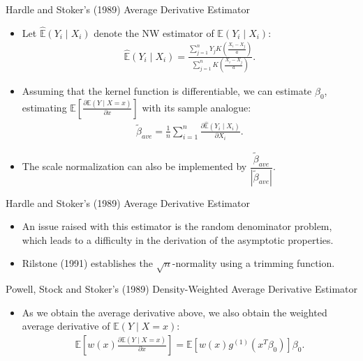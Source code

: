 \documentclass[xcolor=svgnames,dvipdfmx,cjk]{beamer}
\theoremstyle{example}
\def\E{\mathbb{E}}
\begin{document}
\begin{frame}{Hardle and Stoker's (1989) Average Derivative Estimator}
\begin{itemize}
  \item Let $\hat{\E}(Y_i \mid X_i)$ denote the NW estimator of $\E(Y_i \mid X_i)$:
        \begin{align*}
          \hat{\E}(Y_i \mid X_i) 
          = \frac
            {\sum_{j=1}^{n} Y_j K\left( \frac{X_i - X_j}{a} \right)}
            {\sum_{j=1}^{n} K\left( \frac{X_i - X_j}{a} \right)}.
        \end{align*}
  \item Assuming that the kernel function is differentiable, 
        we can estimate $\beta_0$, estimating 
        $\E \left[ 
          \frac{\partial \E(Y \mid X=x)}{\partial x}
        \right]$
        with its sample analogue:
        \begin{align*}
          \tilde{\beta}_{ave} 
          = \frac{1}{n} \sum_{i=1}^{n}
            \frac{\partial \hat{\E}(Y_i \mid X_i)}{\partial X_i}.
        \end{align*}
  \item The scale normalization can also be implemented by 
        $\dfrac{\tilde{\beta}_{ave}}{|\tilde{\beta}_{ave}|}$.
\end{itemize}  
\end{frame}

\begin{frame}{Hardle and Stoker's (1989) Average Derivative Estimator}
\begin{itemize}
  \item An issue raised with this estimator is \alert{the random denominator problem},
        which leads to a difficulty in the derivation of the asymptotic properties.
  \item Rilstone (1991) establishes the $\sqrt{n}$-normality using a trimming function.
\end{itemize}  
\end{frame}


\begin{frame}{Powell, Stock and Stoker's (1989) Density-Weighted Average Derivative Estimator}
\begin{itemize}
  \item As we obtain the average derivative above, 
        we also obtain \alert{the weighted average derivative} of $\E(Y \mid X=x)$:
        \begin{align*}
          \E \left[ w(x)
            \frac {\partial \E(Y \mid X=x)}{\partial x}
          \right]
          =
          \E \left[
            w(x) g^{(1)}(x^T \beta_0)
          \right]
          \beta_0.
        \end{align*}
    
\end{itemize}
\end{frame}
\end{document}
